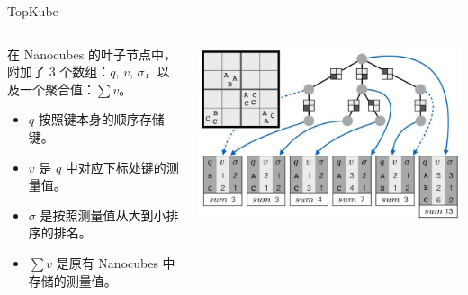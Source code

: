 \documentclass[10pt,aspectratio=169]{ctexbeamer}
\begin{document}
\begin{frame}{TopKube}
    \begin{columns}
        \begin{column}{.6\textwidth}
            在 Nanocubes 的叶子节点中，附加了 3 个数组：$q$, $v$, $\sigma$，以及一个聚合值：$\sum v$。
            \begin{itemize}
                \item $q$ 按照键本身的顺序存储键。
                \item $v$ 是 $q$ 中对应下标处键的测量值。
                \item $\sigma$ 是按照测量值从大到小排序的排名。
                \item $\sum v$ 是原有 Nanocubes 中存储的测量值。
            \end{itemize}
        \end{column}
        \begin{column}{.4\textwidth}
            \includegraphics[width=\textwidth]{pic/topkube.jpg}
        \end{column}
    \end{columns}
\end{frame}
\end{document}

